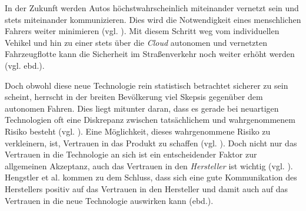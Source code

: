 In der Zukunft werden Autos höchstwahrscheinlich miteinander vernetzt sein und stets miteinander kommunizieren. Dies wird die Notwendigkeit eines menschlichen Fahrers weiter minimieren (vgl. \cite[241]{gerla2014internet}). Mit diesem Schritt weg vom individuellen Vehikel und hin zu einer stets über die \emph{Cloud} autonomen und vernetzten Fahrzeugflotte kann die Sicherheit im Straßenverkehr noch weiter erhöht werden (vgl. ebd.).

Doch obwohl diese neue Technologie rein statistisch betrachtet sicherer zu sein scheint, herrscht in der breiten Bevölkerung viel Skepsis gegenüber dem autonomen Fahren. Dies liegt mitunter daran, dass es gerade bei neuartigen Technologien oft eine Diskrepanz zwischen tatsächlichem und wahrgenommenem Risiko besteht (vgl. \cite[106]{hengstler2016applied}). Eine Möglichkeit, dieses wahrgenommene Risiko zu verkleinern, ist, Vertrauen in das Produkt zu schaffen (vgl. \cite{rousseau1998not}). Doch nicht nur das Vertrauen in die Technologie an sich ist ein entscheidender Faktor zur allgemeinen Akzeptanz, auch das Vertrauen in den \emph{Hersteller} ist wichtig (vgl. \cite[107]{hengstler2016applied}). Hengstler et al. kommen zu dem Schluss, dass sich eine gute Kommunikation des Herstellers positiv auf das Vertrauen in den Hersteller und damit auch auf das Vertrauen in die neue Technologie auswirken kann (ebd.).
